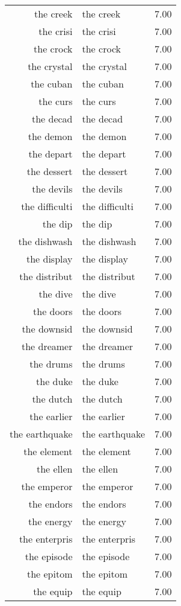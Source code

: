 \begin{table}[ht]
\begin{tabular}{rlr}
  the creek & the creek & 7.00 \\ 
  the crisi & the crisi & 7.00 \\ 
  the crock & the crock & 7.00 \\ 
  the crystal & the crystal & 7.00 \\ 
  the cuban & the cuban & 7.00 \\ 
  the curs & the curs & 7.00 \\ 
  the decad & the decad & 7.00 \\ 
  the demon & the demon & 7.00 \\ 
  the depart & the depart & 7.00 \\ 
  the dessert & the dessert & 7.00 \\ 
  the devils & the devils & 7.00 \\ 
  the difficulti & the difficulti & 7.00 \\ 
  the dip & the dip & 7.00 \\ 
  the dishwash & the dishwash & 7.00 \\ 
  the display & the display & 7.00 \\ 
  the distribut & the distribut & 7.00 \\ 
  the dive & the dive & 7.00 \\ 
  the doors & the doors & 7.00 \\ 
  the downsid & the downsid & 7.00 \\ 
  the dreamer & the dreamer & 7.00 \\ 
  the drums & the drums & 7.00 \\ 
  the duke & the duke & 7.00 \\ 
  the dutch & the dutch & 7.00 \\ 
  the earlier & the earlier & 7.00 \\ 
  the earthquake & the earthquake & 7.00 \\ 
  the element & the element & 7.00 \\ 
  the ellen & the ellen & 7.00 \\ 
  the emperor & the emperor & 7.00 \\ 
  the endors & the endors & 7.00 \\ 
  the energy & the energy & 7.00 \\ 
  the enterpris & the enterpris & 7.00 \\ 
  the episode & the episode & 7.00 \\ 
  the epitom & the epitom & 7.00 \\ 
  the equip & the equip & 7.00 \\ 

\end{tabular}
\end{table}
